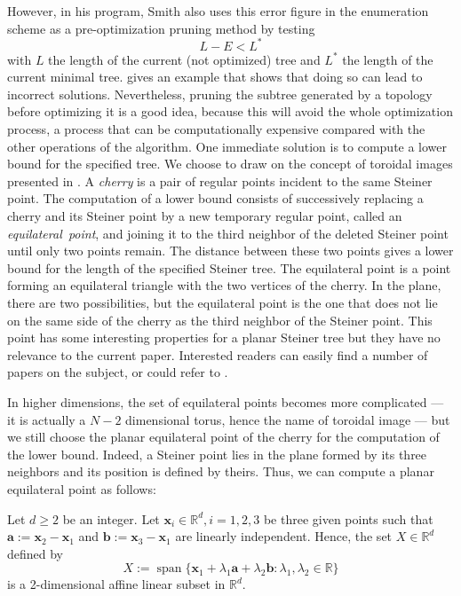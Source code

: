 \documentclass{article}
\theoremstyle{plain}
\DeclareMathOperator{\Span}{span}
\begin{document}
However, in his program, Smith also uses this error figure in the enumeration scheme as a pre-optimization pruning method by testing
\[ L - E < L^*\]
with $L$ the length of the current (not optimized) tree and $L^*$ the length of the current minimal tree. 
 gives an example that shows that doing so can lead to incorrect solutions. 
Nevertheless, pruning the subtree generated by a topology before optimizing it is a good idea, because this will avoid the whole optimization process, a process that can be computationally expensive compared with the other operations of the algorithm. 
One immediate solution is to compute a lower bound for the specified tree. We choose to draw on the concept of toroidal images presented in \cite{ref2}. 
A \emph{cherry} is a pair of regular points incident to the same Steiner point. 
The computation of a lower bound consists of successively replacing a cherry and its Steiner point by a new temporary regular point, called an \mbox{\emph{equilateral point}}, and joining it to the third neighbor of the deleted Steiner point until only two points remain. The distance between these two points gives a lower bound for the length of the specified Steiner tree. 
The equilateral point is a point forming an equilateral triangle with the two vertices of the cherry. 
In the plane, there are two possibilities, but the equilateral point is the one that does not lie on the same side of the cherry as the third neighbor of the Steiner point. 
This point has some interesting properties for a planar Steiner tree but they have no relevance to the current paper. 
Interested readers can easily find a number of papers on the subject, or could refer to \cite{ref4}. 

In higher dimensions, the set of equilateral points becomes more complicated --- it is actually a $N-2$ dimensional torus, hence the name of toroidal image --- but we still choose the planar equilateral point of the cherry for the computation of the lower bound. 
Indeed, a Steiner point lies in the plane formed by its three neighbors and its position is defined by theirs. 
Thus, we can compute a planar equilateral point as follows: 

Let $d \geq 2$ be an integer. 
Let $\textbf{x}_i \in \mathbb{R}^{d}, i = 1, 2, 3$ be three given points such that $\textbf{a} := \textbf{x}_2 - \textbf{x}_1$ and $\textbf{b} := \textbf{x}_3 - \textbf{x}_1$ are linearly independent. 
Hence, the set $X \in \mathbb{R}^{d}$ defined by \[X := \Span \{\textbf{x}_1 + \lambda_1\textbf{a} + \lambda_2\textbf{b} : \lambda_1, \lambda_2 \in \mathbb{R}\}\] is a 2-dimensional affine linear subset in $\mathbb{R}^{d}$.
\end{document}
